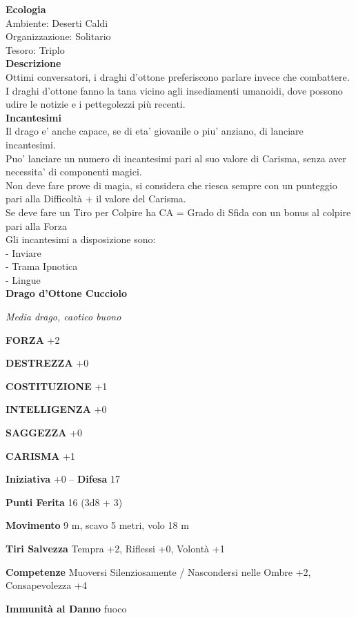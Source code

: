 \begin{multicols}{2}
\textbf{Ecologia}\\
Ambiente: Deserti Caldi\\
Organizzazione: Solitario\\
Tesoro: Triplo\\
\textbf{Descrizione}\\
Ottimi conversatori, i draghi d'ottone preferiscono parlare invece che combattere. I draghi d'ottone fanno la tana vicino agli insediamenti umanoidi, dove possono udire le notizie e i pettegolezzi più recenti.\\
\textbf{Incantesimi}\\
Il drago e' anche capace, se di eta' giovanile o piu' anziano, di lanciare incantesimi.\\
Puo' lanciare un numero di incantesimi pari al suo valore di Carisma, senza aver necessita' di componenti magici.\\
Non deve fare prove di magia, si considera che riesca sempre con un punteggio pari alla Difficoltà + il valore del Carisma.\\
Se deve fare un Tiro per Colpire ha CA = Grado di Sfida con un bonus al colpire pari alla Forza\\
Gli incantesimi a disposizione sono:\\
- Inviare\\
- Trama Ipnotica\\
- Lingue\\

\medskip{}\textbf{Drago d'Ottone Cucciolo}

\emph{Media drago, caotico buono}

\textbf{FORZA} +2

\textbf{DESTREZZA} +0

\textbf{COSTITUZIONE} +1

\textbf{INTELLIGENZA} +0

\textbf{SAGGEZZA} +0

\textbf{CARISMA} +1

\textbf{Iniziativa} +0 -- \textbf{Difesa} 17

\textbf{Punti Ferita} 16 (3d8 + 3)

\textbf{Movimento} 9 m, scavo 5 metri, volo 18 m

\textbf{Tiri Salvezza} Tempra +2, Riflessi +0, Volontà +1

\textbf{Competenze} Muoversi Silenziosamente / Nascondersi nelle Ombre +2, Consapevolezza +4

\textbf{Immunità al Danno} fuoco


\end{multicols}
